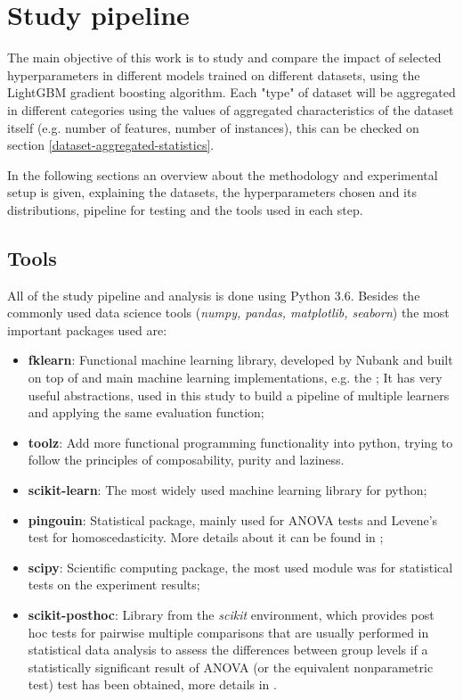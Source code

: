 \chapter{Study pipeline}
\label{cap:study-methodology}

The main objective of this work is to study and compare the impact of selected hyperparameters in different models trained on different datasets, using the LightGBM gradient boosting algorithm. Each "type" of dataset will be aggregated in different categories using the values of aggregated characteristics of the dataset itself (e.g. number of features, number of instances), this can be checked on section \ref{dataset-aggregated-statistics}.

In the following sections an overview about the methodology and experimental setup is given, explaining the datasets, the hyperparameters chosen and its distributions, pipeline for testing and the tools used in each step.

\section{Tools}

All of the study pipeline and analysis is done using Python 3.6. Besides the commonly used data science tools (\textit{numpy, pandas, matplotlib, seaborn}) the most important packages used are:

\begin{itemize}
    \item \textbf{fklearn}: Functional machine learning library, developed by Nubank and built on top of  and main machine learning implementations, e.g. the ; It has very useful abstractions, used in this study to build a pipeline of multiple learners and applying the same evaluation function;
    \item \textbf{toolz}: Add more functional programming functionality into python, trying to follow the principles of composability, purity and laziness.
    \item \textbf{scikit-learn}: The most widely used machine learning library for python;
    \item \textbf{pingouin}: Statistical package, mainly used for ANOVA tests and Levene's test for homoscedasticity. More details about it can be found in \cite{Vallat2018};
    \item \textbf{scipy}: Scientific computing package, the most used module was  for statistical tests on the experiment results;
    \item \textbf{scikit-posthoc}: Library from the \textit{scikit} environment, which provides post hoc tests for pairwise multiple comparisons that are usually performed in statistical data analysis to assess the differences between group levels if a statistically significant result of ANOVA (or the equivalent nonparametric test) test has been obtained, more details in \cite{Terpilowski2019}.

\end{itemize}

